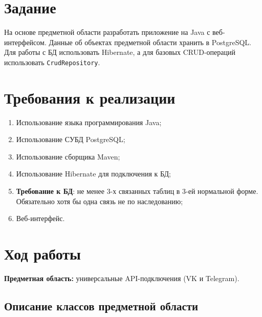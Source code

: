 \documentclass[11pt,a4paper]{article}
\begin{document}
\section*{\normalsize Задание}

На основе предметной области разработать приложение на Java с веб-интерфейсом. Данные об объектах предметной области хранить в PostgreSQL. Для работы с БД использовать Hibernate, а для базовых CRUD-операций использовать \texttt{CrudRepository}.

\section*{\normalsize Требования к реализации}

\begin{enumerate}
    \item Использование языка программирования Java;
    \item Использование СУБД PostgreSQL;
    \item Использование сборщика Maven;
    \item Использование Hibernate для подключения к БД;
    \item \textbf{Требование к БД}: не менее 3-х связанных таблиц в 3-ей нормальной форме. Обязательно хотя бы одна связь не по наследованию;
    \item Веб-интерфейс.
\end{enumerate}

\newpage
\section*{\normalsize Ход работы}

\textbf{Предметная область:} универсальные API-подключения (VK и Telegram).

\subsection*{Описание классов предметной области}
\end{document}
